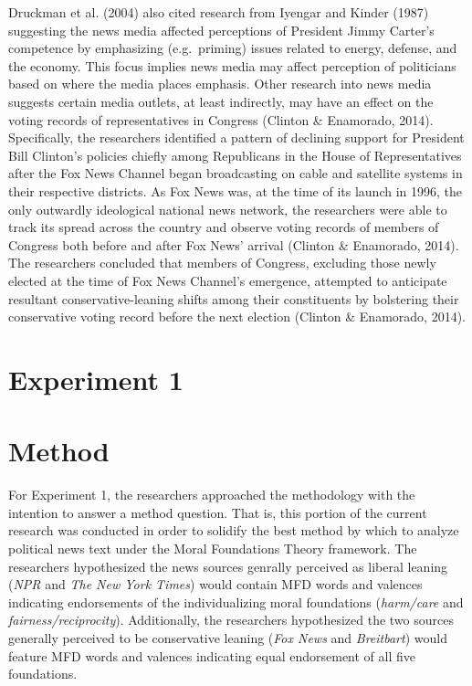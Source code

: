 \documentclass[,man]{apa6}
\begin{document}
Druckman et al. (2004) also cited research from Iyengar and Kinder (1987) suggesting the news media affected perceptions of President Jimmy Carter's competence by emphasizing (e.g.~priming) issues related to energy, defense, and the economy. This focus implies news media may affect perception of politicians based on where the media places emphasis. Other research into news media suggests certain media outlets, at least indirectly, may have an effect on the voting records of representatives in Congress (Clinton \& Enamorado, 2014). Specifically, the researchers identified a pattern of declining support for President Bill Clinton's policies chiefly among Republicans in the House of Representatives after the Fox News Channel began broadcasting on cable and satellite systems in their respective districts. As Fox News was, at the time of its launch in 1996, the only outwardly ideological national news network, the researchers were able to track its spread across the country and observe voting records of members of Congress both before and after Fox News' arrival (Clinton \& Enamorado, 2014). The researchers concluded that members of Congress, excluding those newly elected at the time of Fox News Channel's emergence, attempted to anticipate resultant conservative-leaning shifts among their constituents by bolstering their conservative voting record before the next election (Clinton \& Enamorado, 2014).

\hypertarget{experiment-1}{%
\section{Experiment 1}\label{experiment-1}}

\hypertarget{method}{%
\section{Method}\label{method}}

For Experiment 1, the researchers approached the methodology with the intention to answer a method question. That is, this portion of the current research was conducted in order to solidify the best method by which to analyze political news text under the Moral Foundations Theory framework. The researchers hypothesized the news sources genrally perceived as liberal leaning (\emph{NPR} and \emph{The New York Times}) would contain MFD words and valences indicating endorsements of the individualizing moral foundations (\emph{harm/care} and \emph{fairness/reciprocity}). Additionally, the researchers hypothesized the two sources generally perceived to be conservative leaning (\emph{Fox News} and \emph{Breitbart}) would feature MFD words and valences indicating equal endorsement of all five foundations.
\end{document}
